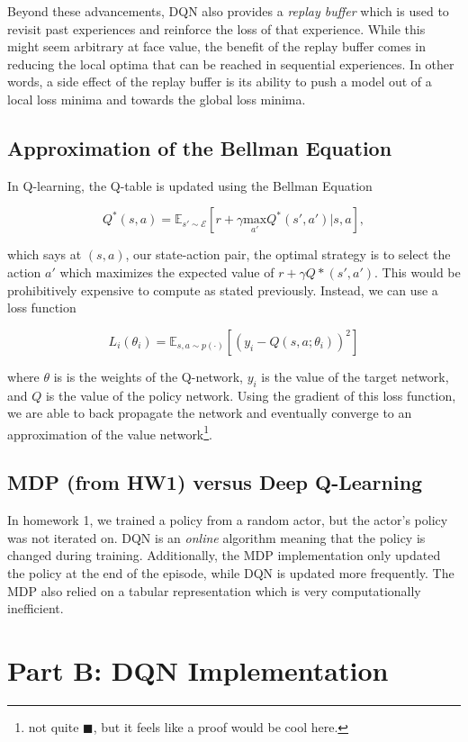\documentclass[10pt]{article}
\begin{document}
Beyond these advancements, DQN also provides a \textit{replay buffer} which is used to revisit past experiences and reinforce the loss of that experience. While this might seem arbitrary at face value, the benefit of the replay buffer comes in reducing the local optima that can be reached in sequential experiences. In other words, a side effect of the replay buffer is its ability to push a model out of a local loss minima and towards the global loss minima.

\subsection{Approximation of the Bellman Equation}

In Q-learning, the Q-table is updated using the Bellman Equation

\[Q^*(s,a) = \mathbb{E}_{s' \sim \mathcal{E}} \left[r + \gamma \underset{a'}{\text{max}}Q^*(s', a')| s,a\right],\]

which says at $(s,a)$, our state-action pair, the optimal strategy is to select the action $a'$ which maximizes the expected value of $r + \gamma Q*(s',a')$. This would be prohibitively expensive to compute as stated previously. Instead, we can use a loss function

\[L_i (\theta_i) = \mathbb{E}_{s, a \sim p(\cdot)} \left[(y_i - Q(s,a;\theta_i))^2\right]\]

where $\theta$ is is the weights of the Q-network, $y_i$ is the value of the target network, and $Q$ is the value of the policy network. Using the gradient of this loss function, we are able to back propagate the network and eventually converge to an approximation of the value network\footnote{not quite $\blacksquare$, but it feels like a proof would be cool here.}.


\subsection{MDP (from HW1) versus Deep Q-Learning}

In homework 1, we trained a policy from a random actor, but the actor's policy was not iterated on. DQN is an \textit{online} algorithm meaning that the policy is changed during training. Additionally, the MDP implementation only updated the policy at the end of the episode, while DQN is updated more frequently. The MDP also relied on a tabular representation which is very computationally inefficient.

\section{Part B: DQN Implementation}
\end{document}
